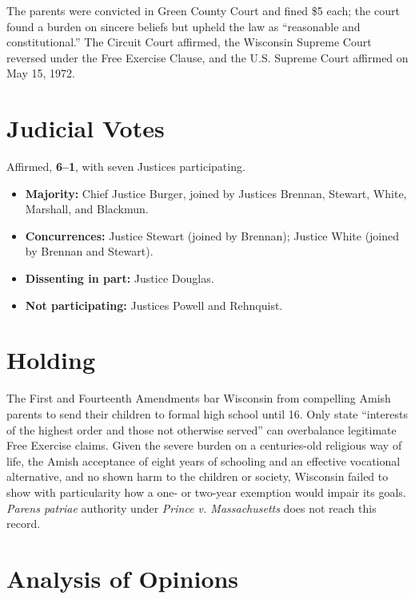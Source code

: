 \documentclass[12pt]{article}
\begin{document}
The parents were convicted in Green County Court and fined \$5 each; the court found a burden on sincere beliefs but upheld the law as ``reasonable and constitutional.'' The Circuit Court affirmed, the Wisconsin Supreme Court reversed under the Free Exercise Clause, and the U.S. Supreme Court affirmed on May 15, 1972.

\section{Judicial Votes}

Affirmed, \textbf{6--1}, with seven Justices participating.
\begin{itemize}
\item \textbf{Majority:} Chief Justice Burger, joined by Justices Brennan, Stewart, White, Marshall, and Blackmun.
\item \textbf{Concurrences:} Justice Stewart (joined by Brennan); Justice White (joined by Brennan and Stewart).
\item \textbf{Dissenting in part:} Justice Douglas.
\item \textbf{Not participating:} Justices Powell and Rehnquist.
\end{itemize}

\section{Holding}

The First and Fourteenth Amendments bar Wisconsin from compelling Amish parents to send their children to formal high school until 16. Only state ``interests of the highest order and those not otherwise served'' can overbalance legitimate Free Exercise claims. Given the severe burden on a centuries-old religious way of life, the Amish acceptance of eight years of schooling and an effective vocational alternative, and no shown harm to the children or society, Wisconsin failed to show with particularity how a one- or two-year exemption would impair its goals. \textit{Parens patriae} authority under \textit{Prince v. Massachusetts} does not reach this record.

\section{Analysis of Opinions}
\end{document}
